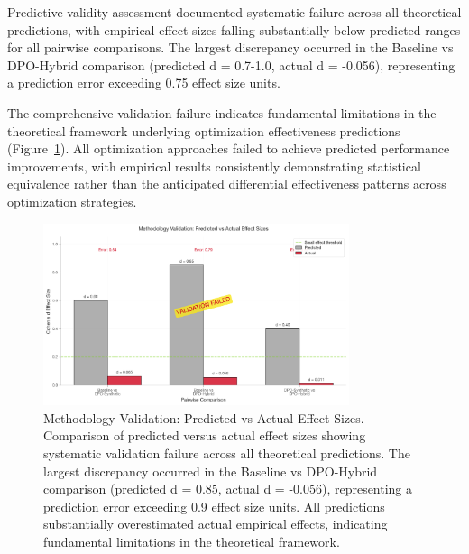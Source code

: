 Predictive validity assessment documented systematic failure across all theoretical predictions, with empirical effect sizes falling substantially below predicted ranges for all pairwise comparisons. The largest discrepancy occurred in the Baseline vs DPO-Hybrid comparison (predicted d = 0.7-1.0, actual d = -0.056), representing a prediction error exceeding 0.75 effect size units.

The comprehensive validation failure indicates fundamental limitations in the theoretical framework underlying optimization effectiveness predictions (Figure~\ref{fig:methodology-validation}). All optimization approaches failed to achieve predicted performance improvements, with empirical results consistently demonstrating statistical equivalence rather than the anticipated differential effectiveness patterns across optimization strategies.

\begin{figure}[H]
\centering
\includegraphics[width=0.8\textwidth]{figures/validation/methodology_validation.png}
\caption[Methodology Validation: Predicted vs Actual Effect Sizes]{Methodology Validation: Predicted vs Actual Effect Sizes. Comparison of predicted versus actual effect sizes showing systematic validation failure across all theoretical predictions. The largest discrepancy occurred in the Baseline vs DPO-Hybrid comparison (predicted d = 0.85, actual d = -0.056), representing a prediction error exceeding 0.9 effect size units. All predictions substantially overestimated actual empirical effects, indicating fundamental limitations in the theoretical framework.}
\label{fig:methodology-validation}
\end{figure}